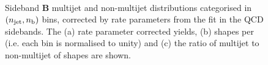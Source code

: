 \clearpage
\begin{figure}[!h]
  \centering
   \\
  \caption{Sideband \textbf{B} multijet and non-multijet distributions
    categorised in $(n_{\text{jet}}, n_{\text{b}})$ bins, corrected by rate parameters
    from the fit in the QCD sidebands. The (a) rate parameter corrected yields,
    (b) \nb shapes per \njet (i.e. each \njet bin is normalised to unity) and
    (c) the ratio of multijet to non-multijet of \nb shapes are shown.}
  \label{fig:qcd_nb_shapes_mhtmetsb}
\end{figure}

